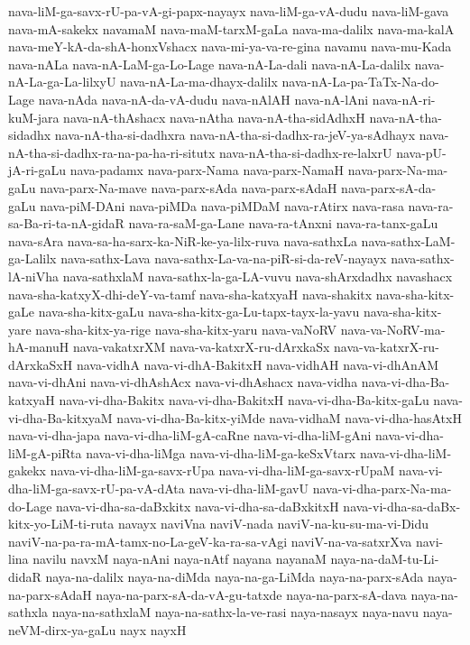 {nava-liM-ga-savx-rU-pa-vA-gi-papx-nayayx
nava-liM-ga-vA-dudu
nava-liM-gava
nava-mA-sakekx
navamaM
nava-maM-tarxM-gaLa
nava-ma-dalilx
nava-ma-kalA
nava-meY-kA-da-shA-honxVshacx
nava-mi-ya-va-re-gina
navamu
nava-mu-Kada
nava-nALa
nava-nA-LaM-ga-Lo-Lage
nava-nA-La-dali
nava-nA-La-dalilx
nava-nA-La-ga-La-lilxyU
nava-nA-La-ma-dhayx-dalilx
nava-nA-La-pa-TaTx-Na-do-Lage
nava-nAda
nava-nA-da-vA-dudu
nava-nAlAH
nava-nA-lAni
nava-nA-ri-kuM-jara
nava-nA-thAshacx
nava-nAtha
nava-nA-tha-sidAdhxH
nava-nA-tha-sidadhx
nava-nA-tha-si-dadhxra
nava-nA-tha-si-dadhx-ra-jeV-ya-sAdhayx
nava-nA-tha-si-dadhx-ra-na-pa-ha-ri-situtx
nava-nA-tha-si-dadhx-re-lalxrU
nava-pU-jA-ri-gaLu
nava-padamx
nava-parx-Nama
nava-parx-NamaH
nava-parx-Na-ma-gaLu
nava-parx-Na-mave
nava-parx-sAda
nava-parx-sAdaH
nava-parx-sA-da-gaLu
nava-piM-DAni
nava-piMDa
nava-piMDaM
nava-rAtirx
nava-rasa
nava-ra-sa-Ba-ri-ta-nA-gidaR
nava-ra-saM-ga-Lane
nava-ra-tAnxni
nava-ra-tanx-gaLu
nava-sAra
nava-sa-ha-sarx-ka-NiR-ke-ya-lilx-ruva
nava-sathxLa
nava-sathx-LaM-ga-Lalilx
nava-sathx-Lava
nava-sathx-La-va-na-piR-si-da-reV-nayayx
nava-sathx-lA-niVha
nava-sathxlaM
nava-sathx-la-ga-LA-vuvu
nava-shArxdadhx
navashacx
nava-sha-katxyX-dhi-deY-va-tamf
nava-sha-katxyaH
nava-shakitx
nava-sha-kitx-gaLe
nava-sha-kitx-gaLu
nava-sha-kitx-ga-Lu-tapx-tayx-la-yavu
nava-sha-kitx-yare
nava-sha-kitx-ya-rige
nava-sha-kitx-yaru
nava-vaNoRV
nava-va-NoRV-ma-hA-manuH
nava-vakatxrXM
nava-va-katxrX-ru-dArxkaSx
nava-va-katxrX-ru-dArxkaSxH
nava-vidhA
nava-vi-dhA-BakitxH
nava-vidhAH
nava-vi-dhAnAM
nava-vi-dhAni
nava-vi-dhAshAcx
nava-vi-dhAshacx
nava-vidha
nava-vi-dha-Ba-katxyaH
nava-vi-dha-Bakitx
nava-vi-dha-BakitxH
nava-vi-dha-Ba-kitx-gaLu
nava-vi-dha-Ba-kitxyaM
nava-vi-dha-Ba-kitx-yiMde
nava-vidhaM
nava-vi-dha-hasAtxH
nava-vi-dha-japa
nava-vi-dha-liM-gA-caRne
nava-vi-dha-liM-gAni
nava-vi-dha-liM-gA-piRta
nava-vi-dha-liMga
nava-vi-dha-liM-ga-keSxVtarx
nava-vi-dha-liM-gakekx
nava-vi-dha-liM-ga-savx-rUpa
nava-vi-dha-liM-ga-savx-rUpaM
nava-vi-dha-liM-ga-savx-rU-pa-vA-dAta
nava-vi-dha-liM-gavU
nava-vi-dha-parx-Na-ma-do-Lage
nava-vi-dha-sa-daBxkitx
nava-vi-dha-sa-daBxkitxH
nava-vi-dha-sa-daBx-kitx-yo-LiM-ti-ruta
navayx
naviVna
naviV-nada
naviV-na-ku-su-ma-vi-Didu
naviV-na-pa-ra-mA-tamx-no-La-geV-ka-ra-sa-vAgi
naviV-na-va-satxrXva
navi-lina
navilu
navxM
naya-nAni
naya-nAtf
nayana
nayanaM
naya-na-daM-tu-Li-didaR
naya-na-dalilx
naya-na-diMda
naya-na-ga-LiMda
naya-na-parx-sAda
naya-na-parx-sAdaH
naya-na-parx-sA-da-vA-gu-tatxde
naya-na-parx-sA-dava
naya-na-sathxla
naya-na-sathxlaM
naya-na-sathx-la-ve-rasi
naya-nasayx
naya-navu
naya-neVM-dirx-ya-gaLu
nayx
nayxH
}
